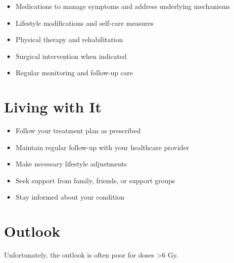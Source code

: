 \begin{itemize}[noitemsep]
  \item Medications to manage symptoms and address underlying mechanisms
  \item Lifestyle modifications and self-care measures
  \item Physical therapy and rehabilitation
  \item Surgical intervention when indicated
  \item Regular monitoring and follow-up care
\end{itemize}
\section{Living with It}
\begin{itemize}[noitemsep]
  \item Follow your treatment plan as prescribed
  \item Maintain regular follow-up with your healthcare provider
  \item Make necessary lifestyle adjustments
  \item Seek support from family, friends, or support groups
  \item Stay informed about your condition
\end{itemize}
\section{Outlook}
Unfortunately, the outlook is often poor for doses >6 Gy.
